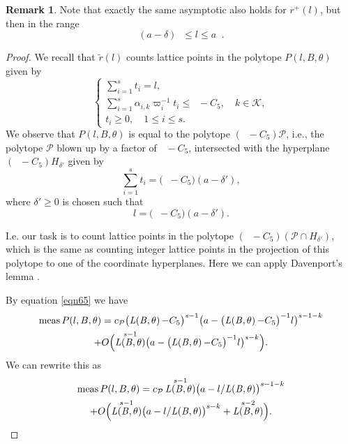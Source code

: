 \documentclass[11pt]{article}
\newcommand{\ie}{i.e.,\xspace}
\numberwithin{equation}{section}
\DeclareMathOperator{\LBt}{\mathit{L(B,\theta)}}
\let\del\delta
\let\tet\theta
\newcommand{\calK}{\mathcal{K}}
\newcommand{\calP}{\mathcal{P}}
\DeclareMathOperator{\meas}{meas}
\theoremstyle{definition}
\newtheorem{remark}[theorem]{Remark}
\numberwithin{theorem}{section}
\begin{document}
\begin{remark}
Note that exactly the same asymptotic also holds for $r^+(l)$, but then in the range\vspace*{-3pt}
\[
(a-\del) \LBt \leq l\leq a \LBt.
\]
\end{remark}

\begin{proof}
We recall that $\tilde{r}(l)$ counts lattice points in the polytope $P(l,B,\tet)$ given by\vspace*{-3pt}
\[
\begin{cases}
\sum_{i=1}^s t_i=l,\\
\sum_{i=1}^s \alpha_{i,k} \varpi_i^{-1}t_i \leq \LBt- C_5 ,\quad k\in \calK,\\
t_i\geq 0,\quad 1\leq i\leq s.
\end{cases}
\]
We observe that $P(l,B,\tet)$ is equal to the polytope $\left(\LBt -C_5\right)\calP$, \ie the polytope $\calP$ blown up by a factor of $\LBt-C_5$, intersected with the hyperplane $\left(\LBt -C_5\right) H_{\del'}$ given by\vspace*{-3pt}
\[
\sum_{i=1}^s t_i= \bigl(\LBt -C_5\bigr) (a-\del'),
\]
where $\del' \geq 0$ is chosen such that\vspace*{-3pt}
\[
l= \bigl(\LBt -C_5\bigr) (a-\del').
\]

I.e. our task is to count lattice points in the polytope $\left(\LBt -C_5\right)(\calP\cap H_{\del'})$, which is the same as counting integer lattice points in the projection of this polytope to one of the coordinate hyperplanes. Here we can apply Davenport's lemma \cite{davenport}.

By equation \eqref{eqn65} we have\vspace*{-3pt}
\begin{multline*}
\meas P(l,B,\tet)= c_{\calP} \bigl(\LBt-C_5\bigr)^{s-1} \bigl(a- \bigl(\LBt-C_5\bigr)^{-1}l\bigr)^{s-1-k} \\
+O\Bigl(\LBt^{s-1} \bigl(a-\bigl(\LBt-C_5\bigr)^{-1}l\bigr)^{s-k}\Bigr).
\end{multline*}
We can rewrite this as\vspace*{-3pt}
\begin{multline*}
\meas P(l,B,\tet)= c_{\calP} \LBt^{s-1} \bigl(a-l/{\LBt}\bigr)^{s-1-k} \\
+O\Bigl(\LBt^{s-1} \bigl(a-l/{\LBt}\bigr)^{s-k} + \LBt^{s-2}\Bigr).
\end{multline*}


\end{proof}
\end{document}
